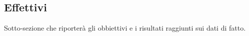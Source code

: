 \subsection{Effettivi}

Sotto-sezione che riporterà gli obbiettivi e i risultati raggiunti sui dati di fatto.